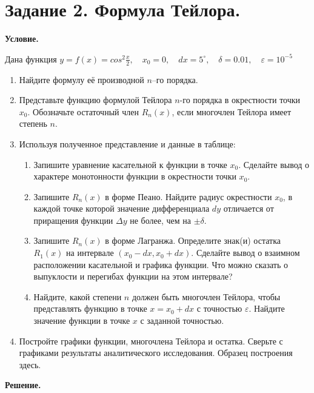 \section{Задание 2. Формула Тейлора.}
\textbf{Условие.}

Дана функция $\displaystyle y = f(x) = cos^2 \frac{x}{2}, \quad x_0 = 0, \quad dx = 5^\circ, \quad \delta = 0.01, \quad \varepsilon = 10^{-5}$\\
\begin{enumerate}
    \item Найдите формулу её производной $n$–го порядка.
    \item Представьте функцию формулой Тейлора $n$-го порядка в окрестности точки $x_0$. Обозначьте остаточный член $R_n(x)$, если многочлен Тейлора имеет степень $n$.
    \item Используя полученное представление и данные в таблице:
    \begin{enumerate}
        \item Запишите уравнение касательной к функции в точке $x_0$. Сделайте вывод о характере монотонности функции в окрестности точки $x_0$.
        \item Запишите $R_n(x)$ в форме Пеано. Найдите радиус окрестности $x_0$, в каждой
        точке которой значение дифференциала $dy$ отличается от приращения функции
        $\Delta y$ не более, чем на $\pm \delta$.
        \item Запишите $R_n(x)$ в форме Лагранжа. Определите знак(и) остатка $R_1(x)$ на
        интервале $(x_0 - dx, x_0 + dx)$. Сделайте вывод о взаимном расположении
        касательной и графика функции. Что можно сказать о выпуклости и перегибах
        функции на этом интервале?
        \item Найдите, какой степени $n$ должен быть многочлен Тейлора, чтобы представлять
        функцию в точке $x = x_0 + dx$ с точностью $\varepsilon$. Найдите значение функции в
        точке $x$ с заданной точностью.
    \end{enumerate}
    \item Постройте графики функции, многочлена Тейлора и остатка. Сверьте с графиками
    результаты аналитического исследования. Образец построения здесь.
\end{enumerate}
\vspace{10mm}
\textbf{Решение.}

